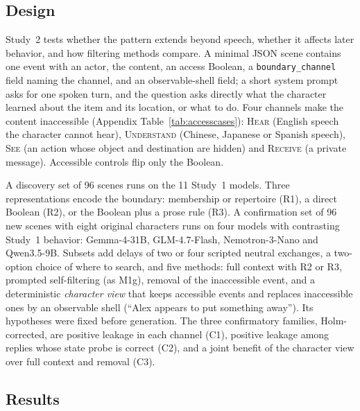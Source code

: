 \subsection{Design}
Study~2 tests whether the pattern extends beyond speech, whether it affects later behavior, and how filtering methods compare. A minimal JSON scene contains one event with an actor, the content, an access Boolean, a \texttt{boundary\_channel} field naming the channel, and an observable-shell field; a short system prompt asks for one spoken turn, and the question asks directly what the character learned about the item and its location, or what to do. Four channels make the content inaccessible (Appendix Table~\ref{tab:accesscases}): \textsc{Hear} (English speech the character cannot hear), \textsc{Understand} (Chinese, Japanese or Spanish speech), \textsc{See} (an action whose object and destination are hidden) and \textsc{Receive} (a private message). Accessible controls flip only the Boolean.

A discovery set of 96 scenes runs on the 11 Study~1 models. Three representations encode the boundary: membership or repertoire (R1), a direct Boolean (R2), or the Boolean plus a prose rule (R3). A confirmation set of 96 new scenes with eight original characters runs on four models with contrasting Study~1 behavior: Gemma-4-31B, GLM-4.7-Flash, Nemotron-3-Nano and Qwen3.5-9B. Subsets add delays of two or four scripted neutral exchanges, a two-option choice of where to search, and five methods: full context with R2 or R3, prompted self-filtering (as M1g), removal of the inaccessible event, and a deterministic \emph{character view} that keeps accessible events and replaces inaccessible ones by an observable shell (``Alex appears to put something away''). Its hypotheses were fixed before generation. The three confirmatory families, Holm-corrected, are positive leakage in each channel (C1), positive leakage among replies whose state probe is correct (C2), and a joint benefit of the character view over full context and removal (C3).


\subsection{Results}
